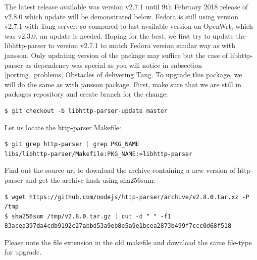 The latest release available was version v2.7.1 until 9th February 2018 release of v2.8.0 which update will be demonstrated below.
Fedora is still using version v2.7.1 with Tang server, so compared to last available version on OpenWrt, which was v2.3.0, an update is needed.
Hoping for the best, we first try to update the libhttp-parser to version v2.7.1 to match Fedora version similar way as with jansson.
Only updating version of the package may suffice but the case of libhttp-parser as dependency was special as you will notice in subsection \ref{porting_problems} Obstacles of delivering Tang.
To upgrade this package, we will do the same as with jansson package.
First, make sure that we are still in packages repository and create branch for the change:
\begin{lstlisting}[columns=fixed,basicstyle=\ttfamily\footnotesize,tabsize=4,backgroundcolor=\color{yellow!10}]
$ git checkout -b libhttp-parser-update master
\end{lstlisting}
Let us locate the http-parser Makefile:
\begin{lstlisting}[columns=fixed,basicstyle=\ttfamily\footnotesize,tabsize=4,backgroundcolor=\color{yellow!10}]
$ git grep http-parser | grep PKG_NAME
libs/libhttp-parser/Makefile:PKG_NAME:=libhttp-parser
\end{lstlisting}
Find out the source url to download the archive containing a new version of http-parser and get the archive hash using sha256sum:
\begin{lstlisting}[columns=fixed,basicstyle=\ttfamily\footnotesize,tabsize=4,backgroundcolor=\color{yellow!10}]
$ wget https://github.com/nodejs/http-parser/archive/v2.8.0.tar.xz -P /tmp
$ sha256sum /tmp/v2.8.0.tar.gz | cut -d " " -f1
83acea397da4cdb9192c27abbd53a9eb8e5a9e1bcea2873b499f7ccc0d68f518
\end{lstlisting}
Please note the file extension in the old makefile and download the same file-type for upgrade.

